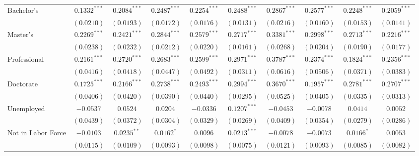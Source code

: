 \documentclass{article}
\begin{document}
\begin{table}
\begin{adjustbox}{width=1\textwidth}
\begin{tabular}{l c c c c c c c c c}
Bachelor's                     & $0.1332^{***}$  & $0.2084^{***}$  & $0.2487^{***}$  & $0.2254^{***}$  & $0.2488^{***}$  & $0.2867^{***}$  & $0.2577^{***}$  & $0.2248^{***}$  & $0.2059^{***}$  \\
                               & $(0.0210)$      & $(0.0193)$      & $(0.0172)$      & $(0.0176)$      & $(0.0131)$      & $(0.0216)$      & $(0.0160)$      & $(0.0153)$      & $(0.0141)$      \\
Master's                       & $0.2269^{***}$  & $0.2421^{***}$  & $0.2844^{***}$  & $0.2579^{***}$  & $0.2717^{***}$  & $0.3381^{***}$  & $0.2998^{***}$  & $0.2713^{***}$  & $0.2216^{***}$  \\
                               & $(0.0238)$      & $(0.0232)$      & $(0.0212)$      & $(0.0220)$      & $(0.0161)$      & $(0.0268)$      & $(0.0204)$      & $(0.0190)$      & $(0.0177)$      \\
Professional                   & $0.2161^{***}$  & $0.2720^{***}$  & $0.2683^{***}$  & $0.2599^{***}$  & $0.2971^{***}$  & $0.3787^{***}$  & $0.2374^{***}$  & $0.1824^{***}$  & $0.2356^{***}$  \\
                               & $(0.0416)$      & $(0.0418)$      & $(0.0447)$      & $(0.0492)$      & $(0.0311)$      & $(0.0616)$      & $(0.0506)$      & $(0.0371)$      & $(0.0383)$      \\
Doctorate                      & $0.1725^{***}$  & $0.2166^{***}$  & $0.2738^{***}$  & $0.2493^{***}$  & $0.2994^{***}$  & $0.3670^{***}$  & $0.1957^{***}$  & $0.2781^{***}$  & $0.2707^{***}$  \\
                               & $(0.0406)$      & $(0.0420)$      & $(0.0390)$      & $(0.0440)$      & $(0.0295)$      & $(0.0525)$      & $(0.0405)$      & $(0.0335)$      & $(0.0313)$      \\
Unemployed                     & $-0.0537$       & $0.0524$        & $0.0204$        & $-0.0336$       & $0.1207^{***}$  & $-0.0453$       & $-0.0078$       & $0.0414$        & $0.0052$        \\
                               & $(0.0439)$      & $(0.0372)$      & $(0.0304)$      & $(0.0329)$      & $(0.0269)$      & $(0.0409)$      & $(0.0354)$      & $(0.0279)$      & $(0.0286)$      \\
Not in Labor Force             & $-0.0103$       & $0.0235^{**}$   & $0.0162^{*}$    & $0.0096$        & $0.0213^{***}$  & $-0.0078$       & $-0.0073$       & $0.0166^{*}$    & $0.0053$        \\
                               & $(0.0115)$      & $(0.0109)$      & $(0.0093)$      & $(0.0098)$      & $(0.0075)$      & $(0.0121)$      & $(0.0093)$      & $(0.0085)$      & $(0.0082)$      \\

\end{tabular}
\end{adjustbox}
\end{table}
\end{document}
